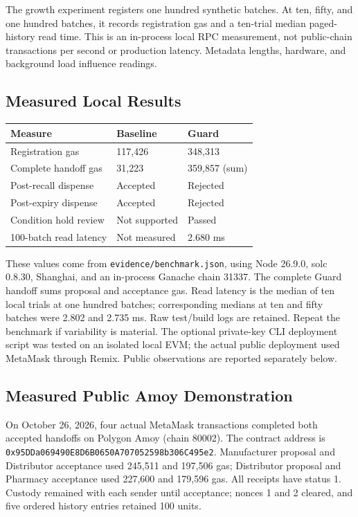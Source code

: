 The growth experiment registers one hundred synthetic batches. At ten, fifty, and one hundred batches, it records registration gas and a ten-trial median paged-history read time. This is an in-process local RPC measurement, not public-chain transactions per second or production latency. Metadata lengths, hardware, and background load influence readings.

\subsection{Measured Local Results}
\begin{center}\small
\begin{tabularx}{\columnwidth}{@{}lXX@{}}\toprule
\textbf{Measure} & \textbf{Baseline} & \textbf{Guard}\\\midrule
Registration gas & 117,426 & 348,313\\
Complete handoff gas & 31,223 & 359,857 (sum)\\
Post-recall dispense & Accepted & Rejected\\
Post-expiry dispense & Accepted & Rejected\\
Condition hold review & Not supported & Passed\\
100-batch read latency & Not measured & 2.680 ms\\\bottomrule
\end{tabularx}\end{center}

These values come from \texttt{evidence/benchmark.json}, using Node 26.9.0, solc 0.8.30, Shanghai, and an in-process Ganache chain 31337. The complete Guard handoff sums proposal and acceptance gas. Read latency is the median of ten local trials at one hundred batches; corresponding medians at ten and fifty batches were 2.802 and 2.735 ms. Raw test/build logs are retained. Repeat the benchmark if variability is material. The optional private-key CLI deployment script was tested on an isolated local EVM; the actual public deployment used MetaMask through Remix. Public observations are reported separately below.

\subsection{Measured Public Amoy Demonstration}
On October 26, 2026, four actual MetaMask transactions completed both accepted handoffs on Polygon Amoy (chain 80002). The contract address is \nolinkurl{0x95DDa069490E8D6B0650A707052598b306C495e2}. Manufacturer proposal and Distributor acceptance used 245,511 and 197,506 gas; Distributor proposal and Pharmacy acceptance used 227,600 and 179,596 gas. All receipts have status 1. Custody remained with each sender until acceptance; nonces 1 and 2 cleared, and five ordered history entries retained 100 units.


